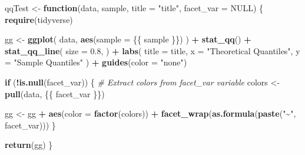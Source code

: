 \documentclass[
]{article}
\newenvironment{Shaded}{\begin{snugshade}}{\end{snugshade}}
\newcommand{\AttributeTok}[1]{\textcolor[rgb]{0.13,0.29,0.53}{#1}}
\newcommand{\CommentTok}[1]{\textcolor[rgb]{0.56,0.35,0.01}{\textit{#1}}}
\newcommand{\ConstantTok}[1]{\textcolor[rgb]{0.56,0.35,0.01}{#1}}
\newcommand{\ControlFlowTok}[1]{\textcolor[rgb]{0.13,0.29,0.53}{\textbf{#1}}}
\newcommand{\FloatTok}[1]{\textcolor[rgb]{0.00,0.00,0.81}{#1}}
\newcommand{\FunctionTok}[1]{\textcolor[rgb]{0.13,0.29,0.53}{\textbf{#1}}}
\newcommand{\NormalTok}[1]{#1}
\newcommand{\OtherTok}[1]{\textcolor[rgb]{0.56,0.35,0.01}{#1}}
\newcommand{\SpecialCharTok}[1]{\textcolor[rgb]{0.81,0.36,0.00}{\textbf{#1}}}
\newcommand{\StringTok}[1]{\textcolor[rgb]{0.31,0.60,0.02}{#1}}
\begin{document}
\begin{Shaded}
\begin{Highlighting}[]
\NormalTok{qqTest }\OtherTok{\textless{}{-}} \ControlFlowTok{function}\NormalTok{(data, sample, }\AttributeTok{title =} \StringTok{"title"}\NormalTok{, }\AttributeTok{facet\_var =} \ConstantTok{NULL}\NormalTok{) \{}
  \FunctionTok{require}\NormalTok{(tidyverse)}

\NormalTok{  gg }\OtherTok{\textless{}{-}} \FunctionTok{ggplot}\NormalTok{(}
\NormalTok{    data,}
    \FunctionTok{aes}\NormalTok{(}\AttributeTok{sample =}\NormalTok{ \{\{ sample \}\})}
\NormalTok{  ) }\SpecialCharTok{+}
    \FunctionTok{stat\_qq}\NormalTok{() }\SpecialCharTok{+}
    \FunctionTok{stat\_qq\_line}\NormalTok{(}
      \AttributeTok{size =} \FloatTok{0.8}\NormalTok{,}
\NormalTok{    ) }\SpecialCharTok{+}
    \FunctionTok{labs}\NormalTok{(}
      \AttributeTok{title =}\NormalTok{ title,}
      \AttributeTok{x =} \StringTok{"Theoretical Quantiles"}\NormalTok{,}
      \AttributeTok{y =} \StringTok{"Sample Quantiles"}
\NormalTok{    ) }\SpecialCharTok{+}
    \FunctionTok{guides}\NormalTok{(}\AttributeTok{color =} \StringTok{"none"}\NormalTok{)}

  \ControlFlowTok{if}\NormalTok{ (}\SpecialCharTok{!}\FunctionTok{is.null}\NormalTok{(facet\_var)) \{}
    \CommentTok{\# Extract colors from facet\_var variable}
\NormalTok{    colors }\OtherTok{\textless{}{-}} \FunctionTok{pull}\NormalTok{(data, \{\{ facet\_var \}\})}

\NormalTok{    gg }\OtherTok{\textless{}{-}}\NormalTok{ gg }\SpecialCharTok{+} \FunctionTok{aes}\NormalTok{(}\AttributeTok{color =} \FunctionTok{factor}\NormalTok{(colors)) }\SpecialCharTok{+} \FunctionTok{facet\_wrap}\NormalTok{(}\FunctionTok{as.formula}\NormalTok{(}\FunctionTok{paste}\NormalTok{(}\StringTok{"\textasciitilde{}"}\NormalTok{, facet\_var)))}
\NormalTok{  \}}

  \FunctionTok{return}\NormalTok{(gg)}
\NormalTok{\}}
\end{Highlighting}
\end{Shaded}
\end{document}
